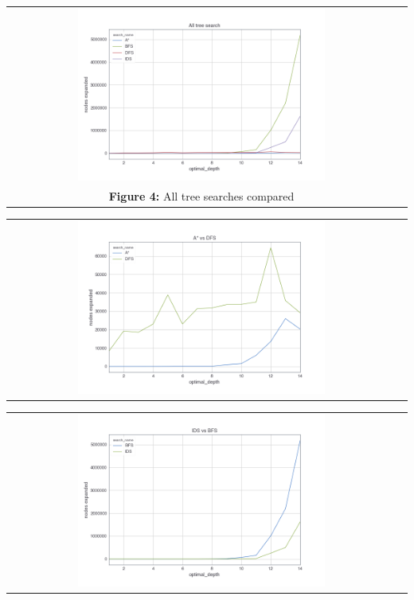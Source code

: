 \documentclass[10pt]{article}
\begin{document}
  \begin{center}
    \begin{tabular}{cc}
    \includegraphics[width=0.65\textwidth]{images/all_tree.png} \\
    \textbf{Figure 4: } All tree searches compared \\
     \end{tabular}
    \end{center}
  
  \begin{center}
    \begin{tabular}{cc}
    \includegraphics[width=0.65\textwidth]{images/a_star_vs_dfs.png} \\
      \end{tabular}
    \end{center}
  
  \begin{center}
    \begin{tabular}{cc}
    \includegraphics[width=0.65\textwidth]{images/ids_bfs.png} \\
      \end{tabular}
    \end{center}
\end{document}
